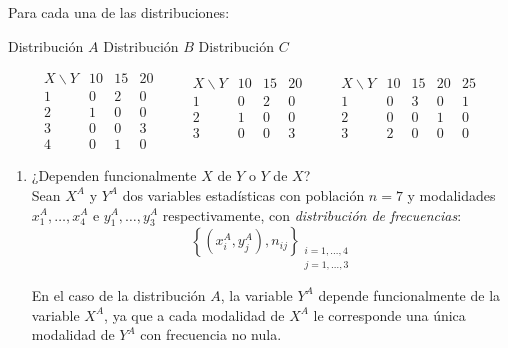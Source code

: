 \begin{ejercicio}
    Para cada una de las distribuciones:
    \begin{center}
        Distribución $A$ \hspace{1.8cm}
        Distribución $B$ \hspace{1.9cm}
        Distribución $C$
    \end{center}
    \begin{equation*}
        \begin{array}{c|ccc}
            X\backslash Y & 10 & 15 & 20\\ \hline
            1 & 0 & 2 & 0\\
            2 & 1 & 0 & 0\\
            3 & 0 & 0 & 3\\
            4 & 0 & 1 & 0 
        \end{array}
        \qquad
        \begin{array}{c|ccc}
            X\backslash Y & 10 & 15 & 20\\ \hline
            1 & 0 & 2 & 0\\
            2 & 1 & 0 & 0\\
            3 & 0 & 0 & 3\\
        \end{array}
        \qquad
        \begin{array}{c|cccc}
            X\backslash Y & 10 & 15 & 20 & 25\\ \hline
            1 & 0 & 3 & 0 & 1\\
            2 & 0 & 0 & 1 & 0\\
            3 & 2 & 0 & 0 & 0\\
        \end{array}
    \end{equation*}
    \begin{enumerate}
        \item ¿Dependen funcionalmente $X$ de $Y$ o $Y$ de $X$?\\

        Sean $X^A$ y $Y^A$ dos variables estadísticas con población $n=7$ y modalidades $x_1^A, \dots, x_4^A$ e $y_1^A, \dots, y_3^A$ respectivamente, con \emph{distribución de frecuencias}:
        $$\left\{ (x_i^A,y_j^A), n_{ij}\right\}_{\substack{i=1,\dots,4\\j=1,\dots,3}}$$
        
        En el caso de la distribución $A$, la variable $Y^A$ depende funcionalmente de la variable $X^A$, ya que a cada modalidad de $X^A$ le corresponde una única modalidad de $Y^A$ con frecuencia no nula.


\end{enumerate}
\end{ejercicio}
